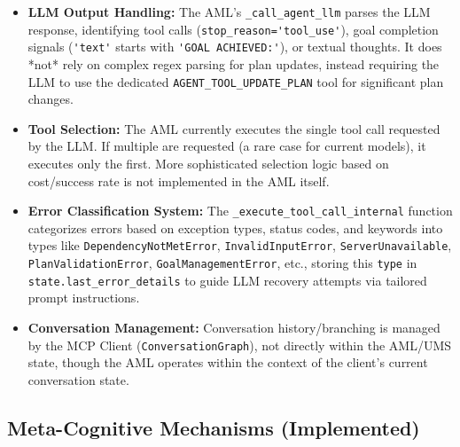 \documentclass[12pt,a4paper]{article}
\newcommand{\code}[1]{\nolinkurl{#1}}
\begin{document}
\begin{itemize}
    \item \textbf{LLM Output Handling:} The AML's \code{\_call\_agent\_llm} parses the LLM response, identifying tool calls (\code{stop\_reason='tool\_use'}), goal completion signals (\code{'text'} starts with \code{'GOAL ACHIEVED:'}), or textual thoughts. It does *not* rely on complex regex parsing for plan updates, instead requiring the LLM to use the dedicated \code{AGENT\_TOOL\_UPDATE\_PLAN} tool for significant plan changes.
    \item \textbf{Tool Selection:} The AML currently executes the single tool call requested by the LLM. If multiple are requested (a rare case for current models), it executes only the first. More sophisticated selection logic based on cost/success rate is not implemented in the AML itself.
    \item \textbf{Error Classification System:} The \code{\_execute\_tool\_call\_internal} function categorizes errors based on exception types, status codes, and keywords into types like \code{DependencyNotMetError}, \code{InvalidInputError}, \code{ServerUnavailable}, \code{PlanValidationError}, \code{GoalManagementError}, etc., storing this \code{type} in \code{state.last\_error\_details} to guide LLM recovery attempts via tailored prompt instructions.
    \item \textbf{Conversation Management:} Conversation history/branching is managed by the MCP Client (\code{ConversationGraph}), not directly within the AML/UMS state, though the AML operates within the context of the client's current conversation state.
\end{itemize}

\subsection{Meta-Cognitive Mechanisms (Implemented)}
\end{document}
